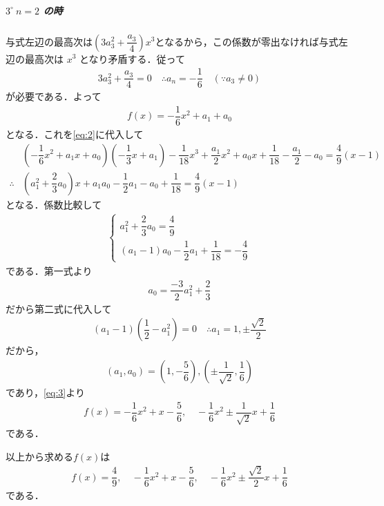 \documentclass[../../main.tex]{subfiles}
\begin{document}
\subparagraph{$3^\circ \ n = 2$ の時}

与式左辺の最高次は$\left(3 a_3^2+\dfrac{a_3}{4}\right)x^3$となるから，この係数が零出なければ与式左辺の最高次は $x^3$ となり矛盾する．従って
\begin{align}
  3 a_3^2 + \dfrac{a_3}{4} = 0
  \quad \therefore
  a_n = -\dfrac{1}{6} \quad (\because a_3\neq 0)
\end{align}
が必要である．よって
\begin{align}
  f(x) = -\dfrac{1}{6} x^2 + a_1 + a_0 \label{eq:3}
\end{align}
となる．これを\cref{eq:2}に代入して
\begin{align}
  & \left( -\dfrac{1}{6} x^2 + a_1x + a_0 \right) \left( -\dfrac{1}{3} x + a_1 \right)
  - \dfrac{1}{18} x^3 + \dfrac{a_1}{2} x^2 + a_0x + \dfrac{1}{18} - \dfrac{a_1}{2} - a_0 = \dfrac{4}{9} (x - 1) \\
  \therefore
  & \left( a_1^2 + \dfrac{2}{3} a_0 \right) x + a_1a_0 - \dfrac{1}{2} a_1 - a_0 + \dfrac{1}{18} = \dfrac{4}{9} (x - 1)
\end{align}
となる．係数比較して
\begin{align}
  \begin{cases}
    a_1^2 + \dfrac{2}{3} a_0 = \dfrac{4}{9} \\
    (a_1 - 1) a_0 - \dfrac{1}{2} a_1 + \dfrac{1}{18} = -\dfrac{4}{9}
  \end{cases}
\end{align}
である．第一式より
\begin{align}
  a_0 = \dfrac{-3}{2}a_1^2 + \dfrac{2}{3}
\end{align}
だから第二式に代入して
\begin{align}
  (a_1-1)\left(\dfrac{1}{2} - a_1^2\right) = 0
  \quad \therefore
  a_1 = 1, \pm \dfrac{\sqrt{2}}{2}
\end{align}
だから，
\begin{align}
  (a_1, a_0) = \left(1, -\dfrac{5}{6}\right), \left(\pm \dfrac{1}{\sqrt{2}}, \dfrac{1}{6}\right)
\end{align}
であり，\cref{eq:3}より
\begin{align}
  f(x)
  = -\dfrac{1}{6} x^2 + x - \dfrac{5}{6},
  \quad
  -\dfrac{1}{6} x^2 \pm \dfrac{1}{\sqrt{2}} x + \dfrac{1}{6}
\end{align}
である．
\casesend

以上から求める$f(x)$は
\begin{align}
  f(x)
  = \dfrac{4}{9},
  \quad
  -\dfrac{1}{6} x^2 + x - \dfrac{5}{6},
  \quad
  -\dfrac{1}{6} x^2 \pm \dfrac{\sqrt{2}}{2} x + \dfrac{1}{6}
\end{align}
である．

\newpage
\end{document}
